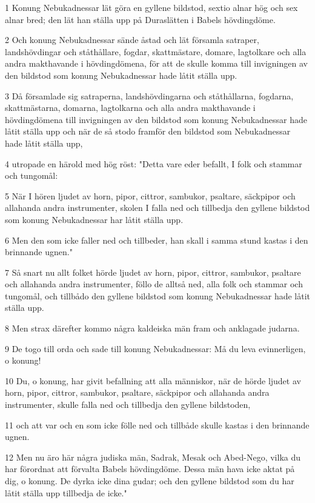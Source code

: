 \par 1 Konung Nebukadnessar lät göra en gyllene bildstod, sextio alnar hög och sex alnar bred; den lät han ställa upp på Duraslätten i Babels hövdingdöme.
\par 2 Och konung Nebukadnessar sände åstad och lät församla satraper, landshövdingar och ståthållare, fogdar, skattmästare, domare, lagtolkare och alla andra makthavande i hövdingdömena, för att de skulle komma till invigningen av den bildstod som konung Nebukadnessar hade låtit ställa upp.
\par 3 Då församlade sig satraperna, landshövdingarna och ståthållarna, fogdarna, skattmästarna, domarna, lagtolkarna och alla andra makthavande i hövdingdömena till invigningen av den bildstod som konung Nebukadnessar hade låtit ställa upp och när de så stodo framför den bildstod som Nebukadnessar hade låtit ställa upp,
\par 4 utropade en härold med hög röst: "Detta vare eder befallt, I folk och stammar och tungomål:
\par 5 När I hören ljudet av horn, pipor, cittror, sambukor, psaltare, säckpipor och allahanda andra instrumenter, skolen I falla ned och tillbedja den gyllene bildstod som konung Nebukadnessar har låtit ställa upp.
\par 6 Men den som icke faller ned och tillbeder, han skall i samma stund kastas i den brinnande ugnen."
\par 7 Så snart nu allt folket hörde ljudet av horn, pipor, cittror, sambukor, psaltare och allahanda andra instrumenter, föllo de alltså ned, alla folk och stammar och tungomål, och tillbådo den gyllene bildstod som konung Nebukadnessar hade låtit ställa upp.
\par 8 Men strax därefter kommo några kaldeiska män fram och anklagade judarna.
\par 9 De togo till orda och sade till konung Nebukadnessar: Må du leva evinnerligen, o konung!
\par 10 Du, o konung, har givit befallning att alla människor, när de hörde ljudet av horn, pipor, cittror, sambukor, psaltare, säckpipor och allahanda andra instrumenter, skulle falla ned och tillbedja den gyllene bildstoden,
\par 11 och att var och en som icke fölle ned och tillbåde skulle kastas i den brinnande ugnen.
\par 12 Men nu äro här några judiska män, Sadrak, Mesak och Abed-Nego, vilka du har förordnat att förvalta Babels hövdingdöme. Dessa män hava icke aktat på dig, o konung. De dyrka icke dina gudar; och den gyllene bildstod som du har låtit ställa upp tillbedja de icke."
